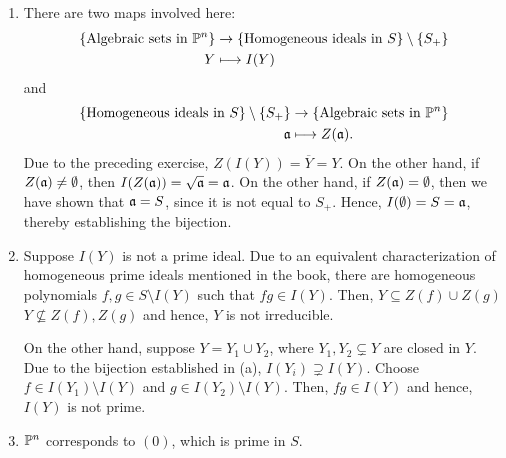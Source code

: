 \begin{exercise}
\begin{enumerate}[label=(\alph*)]
    \item There are two maps involved here:
    \begin{align*}
        \left\{\text{Algebraic sets in }\mathbb{P}^n\right\}&\to\left\{\text{Homogeneous ideals in } S\right\}\setminus\{S_+\}\\
        Y&\longmapsto I(Y)
    \end{align*}
    and 
    \begin{align*}
        \left\{\text{Homogeneous ideals in } S\right\}\setminus\{S_+\}&\to\left\{\text{Algebraic sets in }\mathbb{P}^n\right\}\\
        \mathfrak{a} & \longmapsto Z(\mathfrak{a}).
    \end{align*}
    Due to the preceding exercise, $Z(I(Y)) = \overline Y = Y$. On the other hand, if $Z(\mathfrak{a})\ne\emptyset$, then $I(Z(\mathfrak{a})) = \sqrt{\mathfrak{a}} = \mathfrak{a}$. On the other hand, if $Z(\mathfrak{a}) = \emptyset$, then we have shown that $\mathfrak{a} = S$, since it is not equal to $S_+$. Hence, $I(\emptyset) = S = \mathfrak{a}$, thereby establishing the bijection. 

    \item Suppose $I(Y)$ is not a prime ideal. Due to an equivalent characterization of homogeneous prime ideals mentioned in the book, there are homogeneous polynomials $f,g\in S\setminus I(Y)$ such that $fg\in I(Y)$. Then, $Y\subseteq Z(f)\cup Z(g)$ $Y\not\subseteq Z(f), Z(g)$ and hence, $Y$ is not irreducible. 
    
    On the other hand, suppose $Y = Y_1\cup Y_2$, where $Y_1, Y_2\subsetneq Y$ are closed in $Y$. Due to the bijection established in (a), $I(Y_i)\supsetneq I(Y)$. Choose $f\in I(Y_1)\setminus I(Y)$ and $g\in I(Y_2)\setminus I(Y)$. Then, $fg\in I(Y)$ and hence, $I(Y)$ is not prime.

    \item $\mathbb{P}^n$ corresponds to $(0)$, which is prime in $S$.
\end{enumerate}
\end{exercise}

